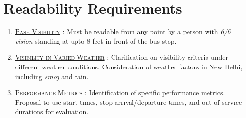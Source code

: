 \section{Readability Requirements}

\begin{enumerate}
    \item {}\underline{\textsc{Base Visibility}} : Must be readable from any point by a person with \textit{\gls{6/6 vision}} standing at upto 8 feet in front of the bus stop.

    \item \underline{\textsc{Visibility in Varied Weather}} : Clarification on visibility criteria under different weather conditions. Consideration of weather factors in New Delhi, including \textit{\gls{smog}} and rain.

    \item \underline{\textsc{Performance Metrics}} : Identification of specific performance metrics. Proposal to use start times, stop arrival/departure times, and out-of-service durations for evaluation.

\end{enumerate}